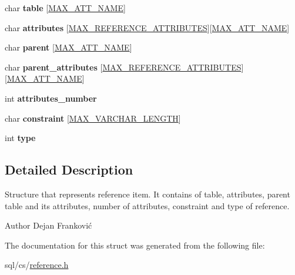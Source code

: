 \begin{DoxyCompactItemize}
\item 
\mbox{\label{structAK__ref__item_a6605be7179a6bb7de63596f21e031fdb}} 
char {\bfseries table} \mbox{[}\hyperlink{constants_8h_ad221251e45ce1d6bfb3eff3b142c0fcd}{M\+A\+X\+\_\+\+A\+T\+T\+\_\+\+N\+A\+ME}\mbox{]}
\item 
\mbox{\label{structAK__ref__item_aad3f2e85932e88100916097e3c1f6a41}} 
char {\bfseries attributes} \mbox{[}\hyperlink{reference_8h_a1892ca5d8fd96ba1813befff40c84ebd}{M\+A\+X\+\_\+\+R\+E\+F\+E\+R\+E\+N\+C\+E\+\_\+\+A\+T\+T\+R\+I\+B\+U\+T\+ES}\mbox{]}\mbox{[}\hyperlink{constants_8h_ad221251e45ce1d6bfb3eff3b142c0fcd}{M\+A\+X\+\_\+\+A\+T\+T\+\_\+\+N\+A\+ME}\mbox{]}
\item 
\mbox{\label{structAK__ref__item_a812f807b2d92ad0cbc9370be98fb24cf}} 
char {\bfseries parent} \mbox{[}\hyperlink{constants_8h_ad221251e45ce1d6bfb3eff3b142c0fcd}{M\+A\+X\+\_\+\+A\+T\+T\+\_\+\+N\+A\+ME}\mbox{]}
\item 
\mbox{\label{structAK__ref__item_a4c79ce00096ba5a132d7d11faa94163b}} 
char {\bfseries parent\+\_\+attributes} \mbox{[}\hyperlink{reference_8h_a1892ca5d8fd96ba1813befff40c84ebd}{M\+A\+X\+\_\+\+R\+E\+F\+E\+R\+E\+N\+C\+E\+\_\+\+A\+T\+T\+R\+I\+B\+U\+T\+ES}\mbox{]}\mbox{[}\hyperlink{constants_8h_ad221251e45ce1d6bfb3eff3b142c0fcd}{M\+A\+X\+\_\+\+A\+T\+T\+\_\+\+N\+A\+ME}\mbox{]}
\item 
\mbox{\label{structAK__ref__item_a69a83ced852fc6e01cfcb0615ad7fc63}} 
int {\bfseries attributes\+\_\+number}
\item 
\mbox{\label{structAK__ref__item_ad1a4236d0f4737ff6cc6b2069e14d402}} 
char {\bfseries constraint} \mbox{[}\hyperlink{constants_8h_a9de30df5b4220028fba997e5def2e9d7}{M\+A\+X\+\_\+\+V\+A\+R\+C\+H\+A\+R\+\_\+\+L\+E\+N\+G\+TH}\mbox{]}
\item 
\mbox{\label{structAK__ref__item_ac9dadb8ee5112dce17f5dfa5e48b9692}} 
int {\bfseries type}
\end{DoxyCompactItemize}


\subsection{Detailed Description}
Structure that represents reference item. It contains of table, attributes, parent table and it\textquotesingle{}s attributes, number of attributes, constraint and type of reference. 

\begin{DoxyAuthor}{Author}
Dejan Franković 
\end{DoxyAuthor}


The documentation for this struct was generated from the following file\+:\begin{DoxyCompactItemize}
\item 
sql/cs/\hyperlink{reference_8h}{reference.\+h}\end{DoxyCompactItemize}
